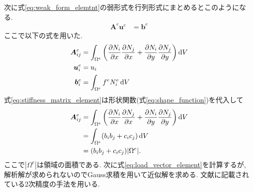 \documentclass[paper=a4]{jlreq}
\begin{document}
次に式\eqref{eq:weak_form_elemtnt}の弱形式を行列形式にまとめるとこのようになる.
\begin{align}
    \bm{A}^e\bm{u}^e &= \bm{b}^e
\end{align}
ここで以下の式を用いた.
\begin{align}
    \bm{A}^e_{ij}
    &= \int_{\Omega^e} \qty(\pdv{N_i}{x}\pdv{N_j}{x} + \pdv{N_i}{y}\pdv{N_j}{y}) \dd{V}
    \label{eq:stiffness_matrix_element}\\
    \bm{u}^e_i &= u_i \\
    \bm{b}^e_i
    &= \int_{\Omega^e} f^eN_i^e\dd{V}
    \label{eq:load_vector_element}
\end{align}
式\eqref{eq:stiffness_matrix_element}は形状関数(式\eqref{eq:shape_function})を代入して
\begin{align}
    \begin{split}
        \bm{A}^e_{ij}
        &= \int_{\Omega^e} \qty(\pdv{N_i}{x}\pdv{N_j}{x} + \pdv{N_i}{y}\pdv{N_j}{y}) \dd{V}  \\
        &= \int_{\Omega^e} (b_ib_j+c_ic_j)\dd{V} \\
        &= (b_ib_j+c_ic_j)|\Omega^e|.
    \end{split}
\end{align}
ここで$|\Omega^e|$は領域の面積である.
次に式\eqref{eq:load_vector_element}を計算するが, 
解析解が求められないのでGauss求積を用いて近似解を求める.
文献\cite{Wriggers2006}に記載されている2次精度の手法を用いる.
\end{document}
